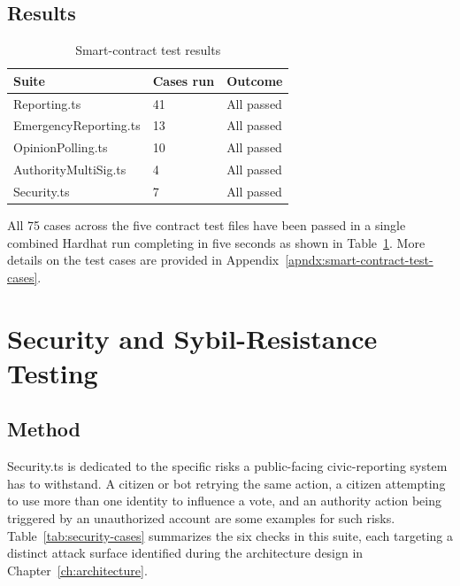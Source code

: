 \subsection{Results}

\begin{table}[htbp]
\centering
\caption{Smart-contract test results}
\label{tab:contract-results}
\begin{tabular}{p{}|p{}|p{}}
    
    Suite & Cases run & Outcome \\
    \hline
    Reporting.ts & 41 & All passed \\
    \hline
    EmergencyReporting.ts & 13 & All passed \\
    \hline
    OpinionPolling.ts & 10 & All passed \\
    \hline
    AuthorityMultiSig.ts & 4 & All passed \\
    \hline
    Security.ts & 7 & All passed \\
    
\end{tabular}
\end{table}


All 75 cases across the five contract test files have been passed in a single combined Hardhat run completing in five seconds as shown in Table~\ref{tab:contract-results}. More details on the test cases are provided in Appendix~\ref{apndx:smart-contract-test-cases}.

\section{Security and Sybil-Resistance Testing}
\label{sec:security-testing}

\subsection{Method}

Security.ts is dedicated to the specific risks a public-facing civic-reporting system has to withstand. A citizen or bot retrying the same action, a citizen attempting to use more than one identity to influence a vote, and an authority action being triggered by an unauthorized account are some examples for such risks. Table~\ref{tab:security-cases} summarizes the six checks in this suite, each targeting a distinct attack surface identified during the architecture design in Chapter~\ref{ch:architecture}.


